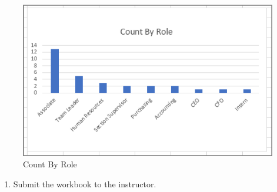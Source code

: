 \begin{figure}[H]
	\centering
	\includegraphics[width=\maxwidth{.95\linewidth}]{gfx/ch07_fig61}
	\caption{Count By Role}
	\label{07:fig61}
\end{figure}

\begin{enumerate}[resume]
	\item Submit the  workbook to the instructor.
\end{enumerate}